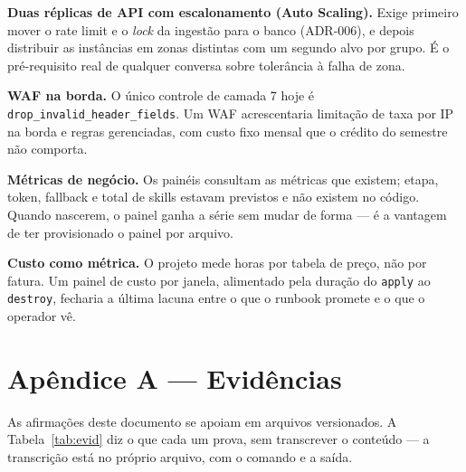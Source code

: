 \documentclass[11pt,a4paper]{article}
\begin{document}
\textbf{Duas réplicas de API com escalonamento (Auto Scaling).} Exige primeiro mover o rate limit e o \emph{lock} da
ingestão para o banco (ADR-006), e depois distribuir as instâncias em zonas distintas com um segundo
alvo por grupo. É o pré-requisito real de qualquer conversa sobre tolerância à falha de zona.

\textbf{WAF na borda.} O único controle de camada 7 hoje é \texttt{drop\_invalid\_\allowbreak header\_fields}.
Um WAF acrescentaria limitação de taxa por IP na borda e regras gerenciadas, com custo fixo mensal
que o crédito do semestre não comporta.

\textbf{Métricas de negócio.} Os painéis consultam as métricas que existem; etapa, token, fallback e
total de skills estavam previstos e não existem no código. Quando nascerem, o painel ganha a série sem
mudar de forma --- é a vantagem de ter provisionado o painel por arquivo.

\textbf{Custo como métrica.} O projeto mede horas por tabela de preço, não por fatura. Um painel de
custo por janela, alimentado pela duração do \texttt{apply} ao \texttt{destroy}, fecharia a última
lacuna entre o que o runbook promete e o que o operador vê.

\section*{Apêndice A --- Evidências}

As afirmações deste documento se apoiam em arquivos versionados. A Tabela~\ref{tab:evid} diz o que
cada um prova, sem transcrever o conteúdo --- a transcrição está no próprio arquivo, com o comando e
a saída.
\end{document}
